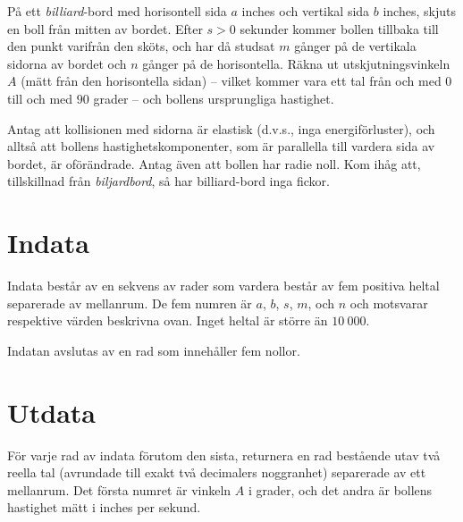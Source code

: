 
På ett \emph{billiard}-bord med horisontell sida $a$ inches och vertikal sida
$b$ inches, skjuts en boll från mitten av bordet. Efter $s > 0$ sekunder
kommer bollen tillbaka till den punkt varifrån den sköts, och har då
studsat $m$ gånger på de vertikala sidorna av bordet och $n$ gånger
på de horisontella. Räkna ut utskjutningsvinkeln $A$ (mätt från den
horisontella sidan) -- vilket kommer vara ett tal från och med $0$ 
till och med $90$ grader -- och bollens ursprungliga hastighet.

Antag att kollisionen med sidorna är elastisk (d.v.s., inga
energiförluster), och alltså att bollens hastighetskomponenter,
som är parallella till vardera sida av bordet, är oförändrade.
Antag även att bollen har radie noll. Kom ihåg att, tillskillnad från
\emph{biljardbord}, så har billiard-bord inga fickor.

\section*{Indata}

Indata består av en sekvens av rader som vardera består av
fem positiva heltal separerade av mellanrum. De fem numren är
$a$, $b$, $s$, $m$, och $n$ och motsvarar respektive värden
beskrivna ovan. Inget heltal är större än $10~000$.

Indatan avslutas av en rad som innehåller fem nollor.

\section*{Utdata}

För varje rad av indata förutom den sista, returnera en rad bestående utav
två reella tal (avrundade till exakt två decimalers noggranhet) separerade
av ett mellanrum. Det första numret är vinkeln $A$ i grader, och det andra
är bollens hastighet mätt i inches per sekund.
